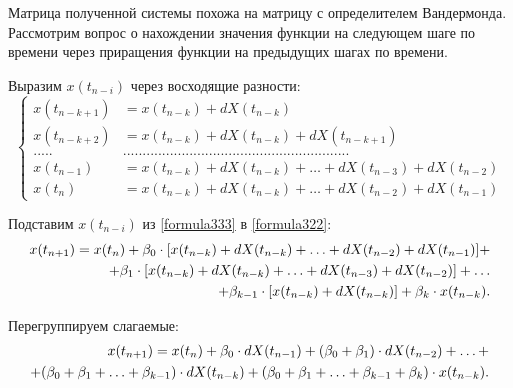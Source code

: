 Матрица полученной системы похожа на матрицу с определителем Вандермонда. Рассмотрим вопрос о нахождении значения функции на следующем шаге по времени через приращения функции на предыдущих шагах по времени. 

Выразим $x(t_{n-i})$ через восходящие разности:
\begin{equation}
\label{formula333}
\left\{
\begin{aligned}
x(t_{n-k+1}) & = x(t_{n-k}) + dX(t_{n-k}) \\
x(t_{n-k+2}) & = x(t_{n-k}) + dX(t_{n-k}) + dX(t_{n-k+1}) \\
..... & .......................................................... \\
x(t_{n-1}) & = x(t_{n-k}) + dX(t_{n-k}) + \dots + dX(t_{n-3}) + dX(t_{n-2}) \\
x(t_n) & = x(t_{n-k}) + dX(t_{n-k}) + \dots + dX(t_{n-2}) + dX(t_{n-1})
\end{aligned}
\right.
\end{equation}

Подставим $x(t_{n-i})$ из \eqref{formula333} в \eqref{formula322}: 
\begin{align}
\label{formula334}
x(t_{n+1})=x(t_n)+\beta_0\cdot [x(t_{n-k}) + dX(t_{n-k}) + \dots + dX(t_{n-2}) + dX(t_{n-1}) ] + \notag \\
+ \beta_1\cdot [x(t_{n-k}) + dX(t_{n-k}) + \dots + dX(t_{n-3}) + dX(t_{n-2})] + \dots \notag \\
+ \beta_{k-1} \cdot [x(t_{n-k}) + dX(t_{n-k})] + \beta_k \cdot x(t_{n-k}).
\end{align}

Перегруппируем слагаемые:
\begin{align}
\label{formula335}
x(t_{n+1})=x(t_n)+\beta_0 \cdot dX(t_{n-1}) + (\beta_0+\beta_1) \cdot dX(t_{n-2}) + \dots + \notag \\
+ (\beta_0 + \beta_1 + \dots + \beta_{k-1}) \cdot dX(t_{n-k}) + (\beta_0 + \beta_1 + \dots + \beta_{k-1} + \beta_k) \cdot x(t_{n-k}).
\end{align}

